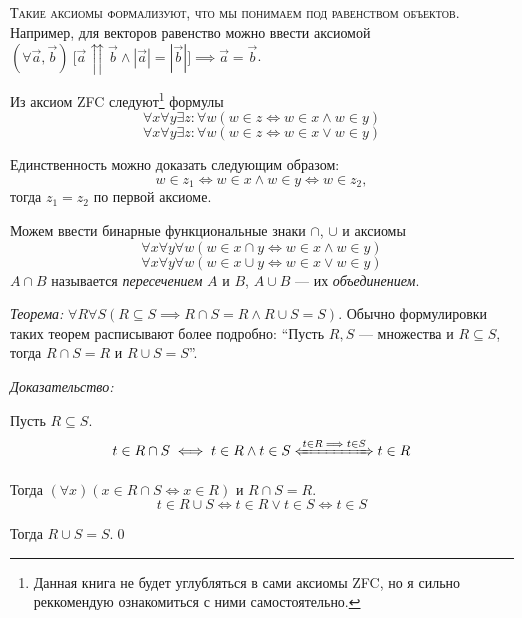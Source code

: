 \textsc{Такие аксиомы формализуют, что мы понимаем под равенством объектов.}
Например, для векторов равенство можно ввести аксиомой
$(\forall \vec{a},\vec{b})~
	\big[\vec{a}\upuparrows\vec{b}\land|\vec{a}|=|\vec{b}|\big]
	\implies \vec{a}=\vec{b}$.

Из аксиом ZFC следуют\footnote{
	Данная книга не будет углубляться в сами аксиомы ZFC, но я сильно реккомендую
	ознакомиться с ними самостоятельно.
} формулы
\[
	\forall x\forall y\exists z:\forall w(w\in z\iff w\in x\land w\in y)
\]
\[
	\forall x\forall y\exists z:\forall w(w\in z\iff w\in x\lor w\in y)
\]

Единственность можно доказать следующим образом:
\[
	w\in z_1\iff w\in x\land w\in y\iff w\in z_2,
\]
тогда $z_1=z_2$ по первой аксиоме.

Можем ввести бинарные функциональные знаки $\cap$, $\cup$ и аксиомы
\[
	\forall x\forall y\forall w(w\in x\cap y\iff w\in x\land w\in y)
\]
\[
	\forall x\forall y\forall w(w\in x\cup y\iff w\in x\lor w\in y)
\]
$A\cap B$ называется {\it пересечением} $A$ и $B$,
$A\cup B$ --- их {\it объединением}.

\vspace{1em}
{\it Теорема:} ${\forall R\forall S(R\subseteq S\implies R\cap S=R\land R\cup S=S)}$.
Обычно формулировки таких теорем расписывают более подробно:
``Пусть $R,S$ --- множества и $R\subseteq S$, тогда $R\cap S=R$ и $R\cup S=S$''.

{\it Доказательство:}

Пусть $R\subseteq S$.
\[
	t\in R\cap S\iff t\in R\land t\in S\xLeftrightarrow{t\in R\implies t\in S} t\in R
\]

Тогда $(\forall x)(x\in R\cap S\iff x\in R)$ и $R\cap S=R$.
\[
	t\in R\cup S\iff t\in R\lor t\in S\iff t\in S
\]

Тогда $R\cup S=S$.\qed


